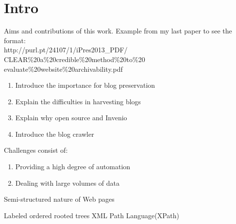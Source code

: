 \section{Intro}

Aims and contributions of this work. Example from my last paper to see the format:\\
http://purl.pt/24107/1/iPres2013\_PDF/\\
CLEAR\%20a\%20credible\%20method\%20to\%20\\
evaluate\%20website\%20archivability.pdf

\begin{enumerate}
  \item Introduce the importance for blog preservation
  \item Explain the difficulties in harvesting blogs
  \item Explain why open source and Invenio
  \item Introduce the blog crawler
\end{enumerate}

Challenges consist of:
\begin{enumerate}
  \item Providing a high degree of automation
  \item Dealing with large volumes of data
\end{enumerate}

Semi-structured nature of Web pages

Labeled ordered rooted trees
XML Path Language(XPath)
